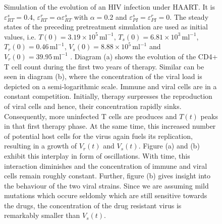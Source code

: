 \begin{figure}
    \caption[]{Simulation of the evolution of an HIV infection under HAART.
    It is $\varepsilon_{RT}^s = 0.4$, $\varepsilon_{RT}^r = \alpha \varepsilon_{RT}^s$ with $\alpha = 0.2$ and 
    $\varepsilon_{PI}^s = \varepsilon_{PI}^r = 0$.
    The steady states of the preceding pretreatment simulation are used as initial values, i.e. $T(0) = 3.19 \times 10^{5} \, \text{ml}^{-1}$, 
    $T_s(0) = 6.81 \times 10^{3} \, \text{ml}^{-1}$, $T_r(0) = 0.46 \, \text{ml}^{-1}$, $V_s(0) = 8.88 \times 10^{5} \, \text{ml}^{-1}$ 
    and $V_r(0) = 39.95 \, \text{ml}^{-1}$ \cite{perelson1993dynamics}.
    Diagram (a) shows the evolution of the CD4+ T cell count during the first two years of therapy.
    Similar can be seen in diagram (b), where the concentration of the viral load is depicted on a semi-logarithmic scale.
    Immune and viral cells are in a constant competition.
    Initially, therapy surpresses the reproduction of viral cells and hence, their concentration rapidly sinks.
    Consequently, more uninfected T cells are produces and $T(t)$ peaks in that first therapy phase.
    At the same time, this increased number of potential host cells for the virus again fuels its replication, resulting in a growth of $V_r(t)$ and $V_s(t)$.
    Figure (a) and (b) exhibit this interplay in form of oscillations. 
    With time, this interaction diminishes and the concentration of immune and viral cells remain roughly constant.
    Further, figure (b) gives insight into the behaviour of the two viral strains. 
    Since we are assuming mild mutations which occure seldomly which are still sensitive towards the drugs, the concentration of the drug resistant virus is remarkably smaller than $V_s(t)$.}
    \label{fig2:treated_eRT_04_alpha_02}
\end{figure}

